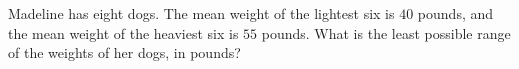 Madeline has eight dogs. The mean weight of the lightest six is $40$ pounds, and the mean weight of the heaviest six is $55$ pounds. What is the least possible range of the weights of her dogs, in pounds?
